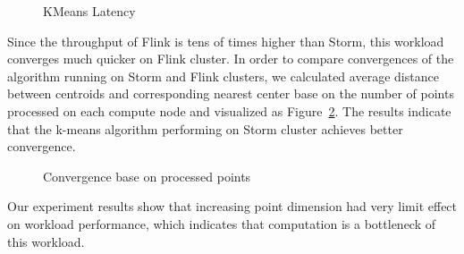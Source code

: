 \begin{figure}
  \begin{center}
   \caption{KMeans Latency}
   \label{fig:kmeans_latency}
  \end{center}
\end{figure}

Since the throughput of Flink is tens of times higher than Storm, this workload converges much quicker on Flink cluster. In order to compare convergences of the algorithm running on Storm and Flink clusters, we calculated average distance between centroids and corresponding nearest center base on the number of points processed on each compute node and visualized as Figure~\ref{fig:converge}. The results indicate that the k-means algorithm performing on Storm cluster achieves better convergence.

\begin{figure}
  \begin{center}
   \caption{Convergence base on processed points }
   \label{fig:converge}
  \end{center}
\end{figure}

Our experiment results show that increasing point dimension had very limit effect on workload performance, which indicates that computation is a bottleneck of this workload.

\clearpage

